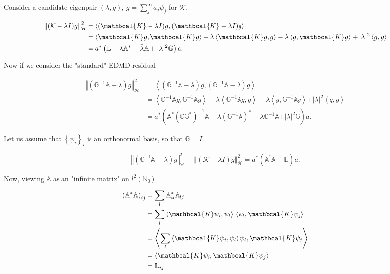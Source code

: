 \documentclass[a4paper]{article}
\newcommand{\bbA}{\mathbb{A}}
\newcommand{\bbG}{\mathbb{G}}
\newcommand{\bbL}{\mathbb{L}}
\newcommand{\sK}{\mathbcal{K}}
\theoremstyle{definition}
\theoremstyle{remark}
\theoremstyle{remark}
\begin{document}
Consider a candidate eigenpair $(\lambda, g),\ g = \sum_{j}^{\infty} a_j \psi_j$ for $\mathcal{K}$. 

\begin{align*}
    \left\Vert (\mathcal{K} - \lambda I) g \right\Vert_{\mathcal{H}}^2
    &= \left\langle (\sK - \lambda I) g, (\sK - \lambda I) g \right\rangle \\
    &= \left\langle \sK g, \sK g \right\rangle - \lambda \left\langle \sK g, g \right\rangle - \bar{\lambda} \left\langle g, \sK g \right\rangle + \vert \lambda \vert^2 \left\langle g, g \right\rangle \\
    &= a^* \left( \mathbb{L} - \lambda \mathbb{A}^* - \bar{\lambda} \mathbb{A} + \vert \lambda \vert^2 \mathbb{G} \right) a . 
\end{align*}

Now if we consider the "standard" EDMD residual

\begin{align*}
    \left\Vert (\bbG^{-1} \bbA - \lambda) g \right\Vert_{\mathcal{H}}^2
    &= \left\langle (\bbG^{-1} \bbA - \lambda)g, (\bbG^{-1} \bbA - \lambda)g \right\rangle \\
    &= \left\langle \bbG^{-1} \bbA g, \bbG^{-1} \bbA g \right\rangle - \lambda \left\langle \bbG^{-1} \bbA g, g \right\rangle - \bar{\lambda} \left\langle g, \bbG^{-1} \bbA g \right\rangle + \vert \lambda \vert^2 \left\langle g, g \right\rangle \\
    &= a^* (\bbA^* (\bbG \bbG^*)^{-1} \bbA - \lambda (\bbG^{-1} \bbA)^* - \bar{\lambda} \bbG^{-1} \bbA + \vert \lambda \vert^2 \bbG) a . 
\end{align*}

Let us assume that $\left\{ \psi_i \right\}_i$ is an orthonormal basis, so that $\bbG = I$. 

\begin{equation*}
    \left\Vert (\bbG^{-1} \bbA - \lambda) g \right\Vert_{\mathcal{H}}^2
    -
    \left\Vert (\mathcal{K} - \lambda I) g \right\Vert_{\mathcal{H}}^2
    =
    a^* (\bbA^* \bbA - \bbL) a. 
\end{equation*}

Now, viewing $\bbA$ as an "infinite matrix" on $l^2(\mathbb{N}_0)$

\begin{align*}
    \left( \bbA^* \bbA \right)_{i j} 
    &= \sum_l \bbA^*_{i l} \bbA_{l j} \\
    &= \sum_l \left\langle \sK \psi_i, \psi_l \right\rangle \, \left\langle \psi_l, \sK \psi_j \right\rangle \\
    &= \left\langle \sum_l \left\langle \sK \psi_i, \psi_l \right\rangle \psi_l, \sK \psi_j \right\rangle \\
    &= \left\langle \sK \psi_i, \sK \psi_j \right\rangle \\
    &= \bbL_{i j}
\end{align*}
\end{document}
